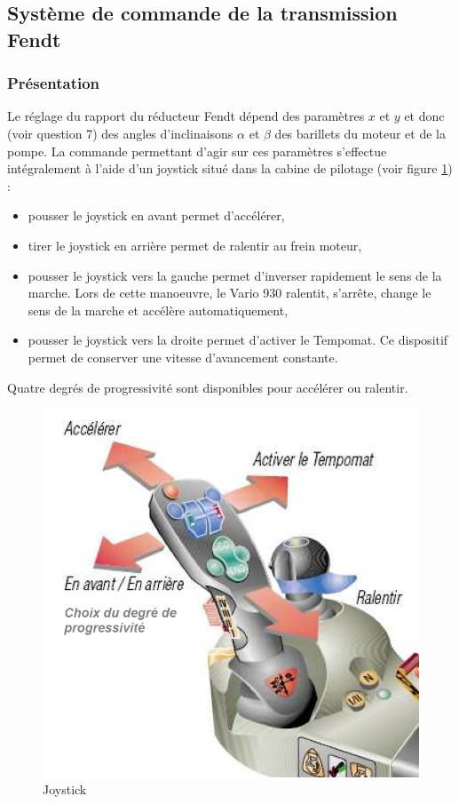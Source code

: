 \subsection{Système de commande de la transmission Fendt}

\subsubsection{Présentation}

Le réglage du rapport du réducteur Fendt dépend des paramètres $x$ et $y$ et donc (voir question 7) des angles d'inclinaisons $\alpha$ et $\beta$ des barillets du moteur et de la pompe. La commande permettant d'agir sur ces paramètres s'effectue intégralement à l'aide d'un joystick situé dans la cabine de pilotage (voir figure \ref{fig19}) :
\begin{itemize}
 \item pousser le joystick en avant permet d'accélérer,
 \item tirer le joystick en arrière permet de ralentir au frein moteur,
 \item pousser le joystick vers la gauche permet d'inverser rapidement le sens de la marche. Lors de cette manoeuvre, le Vario 930 ralentit, s'arrête, change le sens de la marche et accélère automatiquement,
 \item pousser le joystick vers la droite permet d'activer le Tempomat. Ce dispositif permet de conserver une vitesse d'avancement constante.
\end{itemize}

Quatre degrés de progressivité sont disponibles pour accélérer ou ralentir.

\begin{figure}[!h]
\centering\includegraphics[width=0.5\linewidth]{img/Tracteur19.png}
\caption{Joystick}
\label{fig19}
\end{figure}

